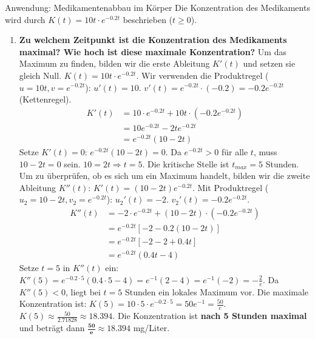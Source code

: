 \begin{loesungsumgebung}{Anwendung: Medikamentenabbau im Körper}
Die Konzentration des Medikaments wird durch $K(t) = 10t \cdot e^{-0.2t}$ beschrieben ($t \ge 0$).

\begin{enumerate}[label=(\alph*)]
    \item \textbf{Zu welchem Zeitpunkt ist die Konzentration des Medikaments maximal? Wie hoch ist diese maximale Konzentration?}
    Um das Maximum zu finden, bilden wir die erste Ableitung $K'(t)$ und setzen sie gleich Null.
    $K(t) = 10t \cdot e^{-0.2t}$. Wir verwenden die Produktregel ($u=10t, v=e^{-0.2t}$):
    $u'(t) = 10$.
    $v'(t) = e^{-0.2t} \cdot (-0.2) = -0.2e^{-0.2t}$ (Kettenregel).
    \begin{align*} K'(t) &= 10 \cdot e^{-0.2t} + 10t \cdot (-0.2e^{-0.2t}) \\ &= 10e^{-0.2t} - 2te^{-0.2t} \\ &= e^{-0.2t}(10 - 2t) \end{align*}
    Setze $K'(t)=0$:
    $e^{-0.2t}(10 - 2t) = 0$.
    Da $e^{-0.2t} > 0$ für alle $t$, muss $10 - 2t = 0$ sein.
    $10 = 2t \Rightarrow t = 5$.
    Die kritische Stelle ist $t_{max} = 5$ Stunden.
    Um zu überprüfen, ob es sich um ein Maximum handelt, bilden wir die zweite Ableitung $K''(t)$:
    $K'(t) = (10 - 2t)e^{-0.2t}$. Mit Produktregel ($u_2=10-2t, v_2=e^{-0.2t}$):
    $u_2'(t) = -2$.
    $v_2'(t) = -0.2e^{-0.2t}$.
    \begin{align*} K''(t) &= -2 \cdot e^{-0.2t} + (10 - 2t) \cdot (-0.2e^{-0.2t}) \\ &= e^{-0.2t}[-2 - 0.2(10 - 2t)] \\ &= e^{-0.2t}[-2 - 2 + 0.4t] \\ &= e^{-0.2t}(0.4t - 4) \end{align*}
    Setze $t=5$ in $K''(t)$ ein:
    $K''(5) = e^{-0.2 \cdot 5}(0.4 \cdot 5 - 4) = e^{-1}(2 - 4) = e^{-1}(-2) = -\frac{2}{e}$.
    Da $K''(5) < 0$, liegt bei $t=5$ Stunden ein lokales Maximum vor.
    Die maximale Konzentration ist:
    $K(5) = 10 \cdot 5 \cdot e^{-0.2 \cdot 5} = 50e^{-1} = \frac{50}{e}$.
    $K(5) \approx \frac{50}{2.71828} \approx 18.394$.
    Die Konzentration ist \textbf{nach 5 Stunden maximal} und beträgt dann $\mathbf{\frac{50}{e} \approx 18.394}$ mg/Liter.


\end{enumerate}
\end{loesungsumgebung}
